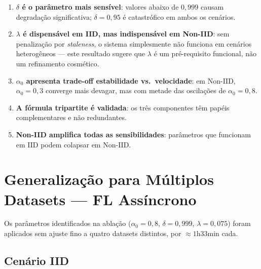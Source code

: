 \documentclass[12pt, a4paper]{article}
\begin{document}
\begin{enumerate}
    \item \textbf{$\delta$ é o parâmetro mais sensível}: valores abaixo de $0{,}999$
    causam degradação significativa; $\delta = 0{,}95$ é catastrófico em ambos os
    cenários.
    \item \textbf{$\lambda$ é dispensável em IID, mas indispensável em Non-IID}:
    sem penalização por \textit{staleness}, o sistema simplesmente não funciona em
    cenários heterogêneos — este resultado sugere que $\lambda$ é um pré-requisito
    funcional, não um refinamento cosmético.

    \item \textbf{$\alpha_0$ apresenta trade-off estabilidade vs.\ velocidade}:
    em Non-IID, $\alpha_0 = 0{,}3$ converge mais devagar, mas com metade das
    oscilações de $\alpha_0 = 0{,}8$.

    \item \textbf{A fórmula tripartite é validada}: os três componentes têm papéis
    complementares e não redundantes.

    \item \textbf{Non-IID amplifica todas as sensibilidades}: parâmetros que
    funcionam em IID podem colapsar em Non-IID.
\end{enumerate}

\section{Generalização para Múltiplos Datasets — FL Assíncrono}

Os parâmetros identificados na ablação ($\alpha_0 = 0{,}8$, $\delta = 0{,}999$,
$\lambda = 0{,}075$) foram aplicados sem ajuste fino a quatro datasets distintos,
por $\approx 1\text{h}33\text{min}$ cada.

\subsection{Cenário IID}
\end{document}
